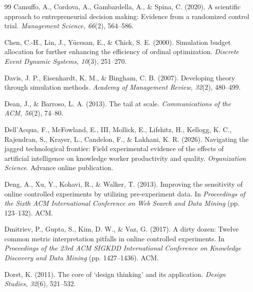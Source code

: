 \begin{thebibliography}{99}
 Camuffo, A., Cordova, A., Gambardella, A., \& Spina, C. (2020). A scientific approach to entrepreneurial decision making: Evidence from a randomized control trial. \textit{Management Science, 66}(2), 564--586. 

 Chen, C.-H., Lin, J., Y{\"u}cesan, E., \& Chick, S. E. (2000). Simulation budget allocation for further enhancing the efficiency of ordinal optimization. \textit{Discrete Event Dynamic Systems, 10}(3), 251--270. 

 Davis, J. P., Eisenhardt, K. M., \& Bingham, C. B. (2007). Developing theory through simulation methods. \textit{Academy of Management Review, 32}(2), 480--499. 

 Dean, J., \& Barroso, L. A. (2013). The tail at scale. \textit{Communications of the ACM, 56}(2), 74--80. 

 Dell'Acqua, F., McFowland, E., III, Mollick, E., Lifshitz, H., Kellogg, K. C., Rajendran, S., Krayer, L., Candelon, F., \& Lakhani, K. R. (2026). Navigating the jagged technological frontier: Field experimental evidence of the effects of artificial intelligence on knowledge worker productivity and quality. \textit{Organization Science}. Advance online publication. 

 Deng, A., Xu, Y., Kohavi, R., \& Walker, T. (2013). Improving the sensitivity of online controlled experiments by utilizing pre-experiment data. In \textit{Proceedings of the Sixth ACM International Conference on Web Search and Data Mining} (pp. 123--132). ACM. 

 Dmitriev, P., Gupta, S., Kim, D. W., \& Vaz, G. (2017). A dirty dozen: Twelve common metric interpretation pitfalls in online controlled experiments. In \textit{Proceedings of the 23rd ACM SIGKDD International Conference on Knowledge Discovery and Data Mining} (pp. 1427--1436). ACM. 

 Dorst, K. (2011). The core of `design thinking' and its application. \textit{Design Studies, 32}(6), 521--532. 


\end{thebibliography}
